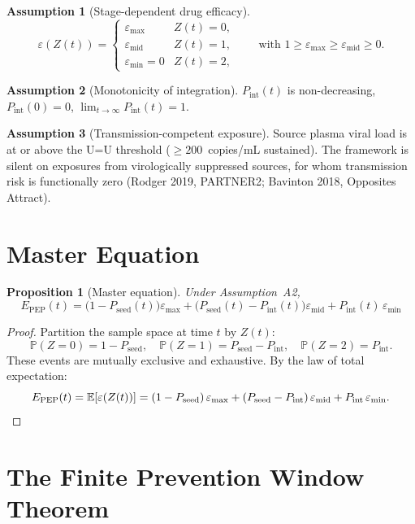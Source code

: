 \documentclass[11pt]{article}
\newtheorem{proposition}{Proposition}[section]
\theoremstyle{definition}
\newtheorem{assumption}{Assumption}[section]
\theoremstyle{remark}
\newcommand{\Pseed}{P_{\text{seed}}}
\newcommand{\Pint}{P_{\text{int}}}
\newcommand{\Epep}{E_{\text{PEP}}}
\newcommand{\emax}{\varepsilon_{\max}}
\newcommand{\emid}{\varepsilon_{\text{mid}}}
\newcommand{\emin}{\varepsilon_{\min}}
\begin{document}
\begin{assumption}[Stage-dependent drug efficacy]
\[
\varepsilon(Z(t)) =
\begin{cases}
\emax & Z(t) = 0,\\
\emid & Z(t) = 1,\\
\emin = 0 & Z(t) = 2,
\end{cases}
\qquad
\text{with } 1 \geq \emax \geq \emid \geq 0.
\]
\end{assumption}

\begin{assumption}[Monotonicity of integration]
$\Pint(t)$ is non-decreasing, $\Pint(0) = 0$, $\lim_{t\to\infty} \Pint(t) = 1$.
\end{assumption}

\begin{assumption}[Transmission-competent exposure]
Source plasma viral load is at or above the U=U threshold ($\geq 200$~copies/mL sustained). The framework is silent on exposures from virologically suppressed sources, for whom transmission risk is functionally zero (Rodger 2019, PARTNER2; Bavinton 2018, Opposites Attract).
\end{assumption}

\section{Master Equation}

\begin{proposition}[Master equation]\label{prop:master}
Under Assumption~A2,
\begin{equation}
\Epep(t) = \big(1 - \Pseed(t)\big)\emax + \big(\Pseed(t) - \Pint(t)\big)\emid + \Pint(t)\,\emin
\label{eq:master_si}
\end{equation}
\end{proposition}

\begin{proof}
Partition the sample space at time $t$ by $Z(t)$:
\[
\mathbb{P}(Z = 0) = 1 - \Pseed,\quad
\mathbb{P}(Z = 1) = \Pseed - \Pint,\quad
\mathbb{P}(Z = 2) = \Pint.
\]
These events are mutually exclusive and exhaustive. By the law of total expectation:
\[
\Epep(t) = \mathbb{E}[\varepsilon(Z(t))] = (1 - \Pseed)\,\emax + (\Pseed - \Pint)\,\emid + \Pint\,\emin. \qedhere
\]
\end{proof}

\section{The Finite Prevention Window Theorem}
\end{document}
